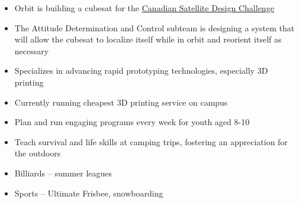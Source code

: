 \documentclass{resume}
\begin{document}
\StudentTeams

\begin{itemize}
    \item Orbit is building a cubesat for the \href{https://www.csdcms.ca/}{Canadian Satellite Design Challenge}
    \item The Attitude Determination and Control subteam is designing a system that will allow the cubesat to localize itself while in orbit and reorient itself as necessary
\end{itemize}

\begin{itemize}
	\item Specializes in advancing rapid prototyping technologies, especially 3D printing
	\item Currently running cheapest 3D printing service on campus
\end{itemize}


\VolunteerWorkExperience

\begin{itemize}
	\item Plan and run engaging programs every week for youth aged 8-10
	\item Teach survival and life skills at camping trips, fostering an appreciation for the outdoors
\end{itemize}

\Education


\Interests

\begin{itemize}
	\item Billiards -- summer leagues
	\item Sports -- Ultimate Frisbee, snowboarding
\end{itemize}
\end{document}
